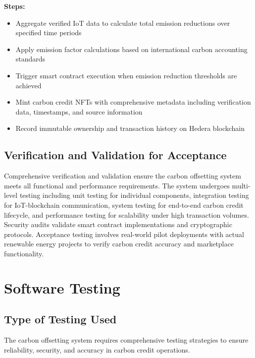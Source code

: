 \documentclass[oneside,a4paper,12pt]{book}
\begin{document}
  \begin{flushleft}
    \textbf{Steps:}
    \begin{itemize}
      \item Aggregate verified IoT data to calculate total emission reductions over specified time periods
      \item Apply emission factor calculations based on international carbon accounting standards
      \item Trigger smart contract execution when emission reduction thresholds are achieved
      \item Mint carbon credit NFTs with comprehensive metadata including verification data, timestamps, and source information
      \item Record immutable ownership and transaction history on Hedera blockchain
    \end{itemize}
  \end{flushleft}
  
  \section{Verification and Validation for Acceptance}
  \begin{flushleft}
    Comprehensive verification and validation ensure the carbon offsetting system meets all functional and performance requirements. The system undergoes multi-level testing including unit testing for individual components, integration testing for IoT-blockchain communication, system testing for end-to-end carbon credit lifecycle, and performance testing for scalability under high transaction volumes. Security audits validate smart contract implementations and cryptographic protocols. Acceptance testing involves real-world pilot deployments with actual renewable energy projects to verify carbon credit accuracy and marketplace functionality.
  \end{flushleft}

\chapter{Software Testing}
\newpage
 \section{Type of Testing Used}

The carbon offsetting system requires comprehensive testing strategies to ensure reliability, security, and accuracy in carbon credit operations.
\end{document}

